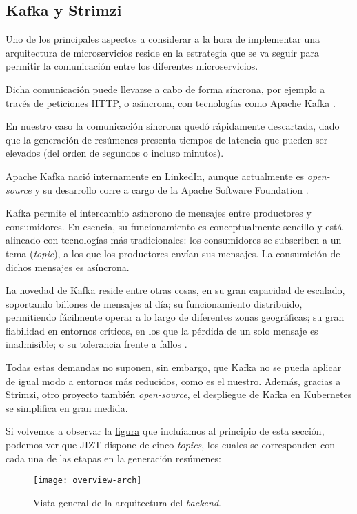\subsection{Kafka y Strimzi} \label{subsec:kafka}

Uno de los principales aspectos a considerar a la hora de implementar una arquitectura de microservicios reside en la estrategia que se va seguir para permitir la comunicación entre los diferentes microservicios.

Dicha comunicación puede llevarse a cabo de forma síncrona, por ejemplo a través de peticiones HTTP, o asíncrona, con tecnologías como Apache Kafka \cite{microsoft-microsvcs}.

En nuestro caso la comunicación síncrona quedó rápidamente descartada, dado que la generación de resúmenes presenta tiempos de latencia que pueden ser elevados (del orden de segundos o incluso minutos).

Apache Kafka nació internamente en LinkedIn, aunque actualmente es \emph{open-source} y su desarrollo corre a cargo de la Apache Software Foundation \cite{wiki-kafka}.

Kafka permite el intercambio asíncrono de mensajes entre productores y consumidores. En esencia, su funcionamiento es conceptualmente sencillo y está alineado con tecnologías más tradicionales: los consumidores se subscriben a un tema (\emph{topic}), a los que los productores envían sus mensajes. La consumición de dichos mensajes es asíncrona.

La novedad de Kafka reside entre otras cosas, en su gran capacidad de escalado, soportando billones de mensajes al día; su funcionamiento distribuido, permitiendo fácilmente operar a lo largo de diferentes zonas geográficas; su gran fiabilidad en entornos críticos, en los que la pérdida de un solo mensaje es inadmisible; o su tolerancia frente a fallos \cite{apache-kafka}.

Todas estas demandas no suponen, sin embargo, que Kafka no se pueda aplicar de igual modo a entornos más reducidos, como es el nuestro. Además, gracias a Strimzi, otro proyecto también \emph{open-source}, el despliegue de Kafka en Kubernetes se simplifica en gran medida.

Si volvemos a observar la \hyperref[fig:overview-arch-2]{figura} que incluíamos al principio de esta sección, podemos ver que JIZT dispone de cinco \emph{topics}, los cuales se corresponden con cada una de las etapas en la generación resúmenes:

\begin{figure}[!h]
	\centering
	\texttt{[image: overview-arch]}
	\caption{Vista general de la arquitectura del \emph{backend}.}
	\label{fig:overview-arch-2}
\end{figure}

